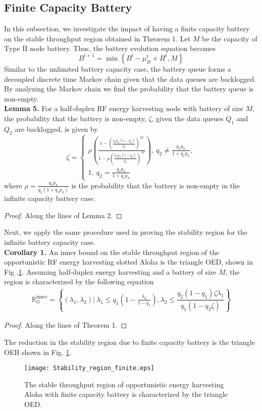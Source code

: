 \documentclass[draftcls,12pt,onecolumn]{IEEEtran}
\begin{document}
\subsection{Finite Capacity Battery}
In this subsection, we investigate the impact of having a finite capacity battery on the stable throughput region obtained in Theorem 1. Let $M$ be the capacity of Type II node battery. Thus, the battery evolution equation becomes 
\begin{equation}
B^{t+1}=\min \left\lbrace B^{t}-\mu_B^{t}+H^{t}, M \right\rbrace 
\end{equation}
Similar to the unlimited battery capacity case, the battery queue forms a decoupled discrete time Markov chain given that the data queues are backlogged. By analyzing the Markov chain we find the probability that the battery queue is non-empty.\\
\indent \textbf{Lemma 5.} For a half-duplex RF energy harvesting node with battery of size $M$, the probability that the battery is non-empty, $\zeta$, given the data queues $Q_1$ and $Q_2$ are backlogged, is given by 
\begin{equation}
\zeta= \begin{cases}
\rho \left( \frac{1-\left( \frac{q_1 p_h (1-q_2)}{q_2}\right)^M}{1- \rho \left( \frac{q_1 p_h (1-q_2)}{q_2}\right)^M}\right) , \ q_2 \neq \frac{q_1 p_h }{1+ q_1 p_h},\\
1,\ q_2 = \frac{q_1 p_h }{1+ q_1 p_h}
\end{cases}
\end{equation}
where $\rho=\frac{q_1 p_h}{q_2(1+q_1 p_h)}$ is the probability that the battery is non-empty in the infinite capacity battery case.
\begin{proof}
Along the lines of Lemma 2.
\end{proof}
\indent Next, we apply the same procedure used in proving the stability region for the infinite battery capacity case. \\
\indent \textbf{Corollary 1.} An inner bound on the stable throughput region of the opportunistic RF energy harvesting slotted Aloha is the triangle OED, shown in Fig .\ref{fig: region finite}. Assuming half-duplex energy harvesting and a battery of size $M$, the region is characterized by the following equation  
\begin{align} \label{eqn thm2}
\mathbb{R}_G^{\text{inner}}= \left\lbrace  (\lambda_1, \lambda_2) | \ \lambda_1 \leq  q_1 \left( 1- \frac{\lambda_2}{1-q_1}\right),  \lambda_2 \leq  \dfrac{q_2 (1-q_1) \zeta \lambda_1}{q_1 \left( 1- q_2 \zeta \right)} \right\rbrace 
\end{align}
\begin{proof}
Along the lines of Theorem 1.
\end{proof}
\indent The reduction in the stability region due to finite capacity battery is the triangle OEB shown in Fig. \ref{fig: region finite}.
\begin{figure}[t]
\texttt{[image: Stability\_region\_finite.eps]}
\centering
\caption{The stable throughput region of opportunistic energy harvesting Aloha with finite capacity battery is characterized by the triangle OED.}\label{fig: region finite}
\end{figure}
\end{document}
